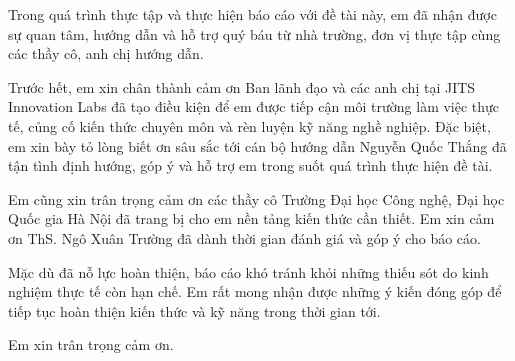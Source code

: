 
Trong quá trình thực tập và thực hiện báo cáo với đề tài này, em đã nhận được sự quan tâm, hướng dẫn và hỗ trợ quý báu từ nhà trường, đơn vị thực tập cùng các thầy cô, anh chị hướng dẫn.

Trước hết, em xin chân thành cảm ơn Ban lãnh đạo và các anh chị tại JITS Innovation Labs đã tạo điều kiện để em được tiếp cận môi trường làm việc thực tế, củng cố kiến thức chuyên môn và rèn luyện kỹ năng nghề nghiệp. Đặc biệt, em xin bày tỏ lòng biết ơn sâu sắc tới cán bộ hướng dẫn Nguyễn Quốc Thắng đã tận tình định hướng, góp ý và hỗ trợ em trong suốt quá trình thực hiện đề tài.

Em cũng xin trân trọng cảm ơn các thầy cô Trường Đại học Công nghệ, Đại học Quốc gia Hà Nội đã trang bị cho em nền tảng kiến thức cần thiết. Em xin cảm ơn ThS. Ngô Xuân Trường đã dành thời gian đánh giá và góp ý cho báo cáo.

Mặc dù đã nỗ lực hoàn thiện, báo cáo khó tránh khỏi những thiếu sót do kinh nghiệm thực tế còn hạn chế. Em rất mong nhận được những ý kiến đóng góp để tiếp tục hoàn thiện kiến thức và kỹ năng trong thời gian tới.

Em xin trân trọng cảm ơn.
\clearpage

